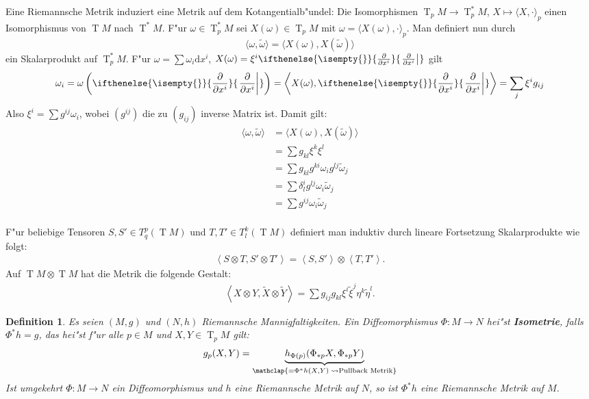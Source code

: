 \documentclass[paper=A4, twoside, chapterprefix=true, bibliography=totoc, headsepline]{scrbook}
\DeclareMathOperator{\T}{T} %
\newcommand{\dop}{\mathrm{d}}
\newcommand{\pdifffrac}[3][]{\ifthenelse{\isempty{#1}}{\frac{\partial #2}{\partial #3}}{\left. \frac{\partial #2}{\partial #3} \right|_{#1}}}
\theoremstyle{plain}
\newtheorem{Dfn}{Definition}[chapter]
\theoremstyle{nonumberplain}
\theoremstyle{empty}
\theoremstyle{break}
\newcommand{\CmIndex}[2][]{\ifthenelse{\isempty{#1}}{\index{#2}}{\index{#1}}#2}
\newcommand{\CmMark}[2][]{\textbf{\CmIndex[#1]{#2}}}
\begin{document}
Eine Riemannsche Metrik induziert eine Metrik auf dem Kotangentialb"undel: Die Isomorphismen $\T_pM \to \T_p^*M$, $X \mapsto \langle X, \cdot \rangle_p$ einen Isomorphismus von $\T M$ nach $\T^*M$.
F"ur $\omega \in \T_p^*M$ sei $X(\omega) \in \T_pM$ mit $\omega = \langle X(\omega), \cdot \rangle_p$.
Man definiert nun durch
\[ \langle \omega, \tilde \omega \rangle = \langle X(\omega), X(\tilde \omega) \rangle \]
ein Skalarprodukt auf $\T_p^*M$. F"ur $\omega = \sum \omega_i \dop x^{i}$, $X(\omega) = \xi^{i} \pdifffrac{}{x^{i}}$ gilt
\[ \omega_i = \omega \left( \pdifffrac{}{x^{i}} \right) = \left\langle X(\omega), \pdifffrac{}{x^{i}} \right\rangle = \sum_j \xi^{i} g_{ij} \]
Also $\xi^{i} = \sum g^{ij} \omega_i$, wobei $(g^{ij})$ die zu $(g_{ij})$ inverse Matrix ist.
Damit gilt:
\begin{align*}
  \langle \omega, \tilde \omega \rangle &= \langle X(\omega), X(\tilde \omega) \rangle \\
  &= \sum g_{kl} \xi^k \xi^l\\
  &= \sum g_{kl} g^{ki} \omega_i g^{lj} \tilde \omega_j\\
  &= \sum \delta_l^i g^{lj} \omega_i \tilde \omega_j\\
  &= \sum g^{ij} \omega_i \tilde \omega_j\\
\end{align*}



F"ur beliebige Tensoren $S, S' \in T_q^p(\T M)$ und $T, T' \in T_l^k(\T M)$ definiert man induktiv durch lineare Fortsetzung Skalarprodukte wie folgt:
\begin{align*}
  \left<S \otimes T, S' \otimes T'\right> = \left<S,S'\right> \otimes \left<T,T'\right>.
\end{align*}
Auf $\T M \otimes \T M$ hat die Metrik die folgende Gestalt:
\begin{align*}
  \left<X \otimes Y,\tilde X \otimes \tilde Y\right> = \sum g_{ij}g_{kl}\xi^i\tilde\xi^j\eta^k\tilde\eta^l.
\end{align*}

\begin{Dfn}
  Es seien $(M, g)$ und $(N,h)$ Riemannsche Mannigfaltigkeiten.
Ein Diffeomorphismus $\Phi \colon M \to N$ hei"st \CmMark{Isometrie}, falls $\Phi^{*}h = g$, das hei"st f"ur alle $p \in M$ und $X,Y \in \T_pM$ gilt:
\begin{align*}
  g_p(X,Y) = \underbrace{h_{\Phi(p)}(\Phi_{*p}X,\Phi_{*p}Y)}_{\mathclap{= \Phi^{*}h(X,Y) \; \rightsquigarrow \text{Pullback Metrik}}}
\end{align*}
Ist umgekehrt $\Phi \colon M \to N$ ein Diffeomorphismus und $h$ eine Riemannsche Metrik auf $N$, so ist $\Phi^{*}h$ eine Riemannsche Metrik auf $M$.
\end{Dfn}
\end{document}
